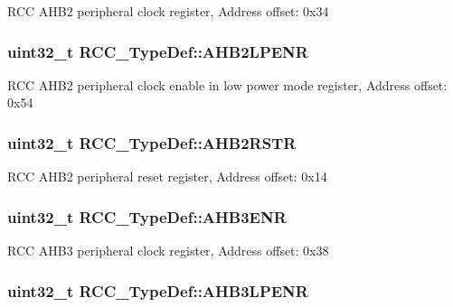 R\-C\-C A\-H\-B2 peripheral clock register, Address offset\-: 0x34 \hypertarget{struct_r_c_c___type_def_a1de344446cba3f4dd15c56fbe20eb0dd}{
\subsubsection[{A\-H\-B2\-L\-P\-E\-N\-R}]{ uint32\-\_\-t R\-C\-C\-\_\-\-Type\-Def\-::\-A\-H\-B2\-L\-P\-E\-N\-R}}\label{struct_r_c_c___type_def_a1de344446cba3f4dd15c56fbe20eb0dd}
R\-C\-C A\-H\-B2 peripheral clock enable in low power mode register, Address offset\-: 0x54 \hypertarget{struct_r_c_c___type_def_a343e0230ded55920ff2a04fbde0e5bcd}{
\subsubsection[{A\-H\-B2\-R\-S\-T\-R}]{ uint32\-\_\-t R\-C\-C\-\_\-\-Type\-Def\-::\-A\-H\-B2\-R\-S\-T\-R}}\label{struct_r_c_c___type_def_a343e0230ded55920ff2a04fbde0e5bcd}
R\-C\-C A\-H\-B2 peripheral reset register, Address offset\-: 0x14 \hypertarget{struct_r_c_c___type_def_ad4ea7be562b42e2ae1a84db44121195d}{
\subsubsection[{A\-H\-B3\-E\-N\-R}]{ uint32\-\_\-t R\-C\-C\-\_\-\-Type\-Def\-::\-A\-H\-B3\-E\-N\-R}}\label{struct_r_c_c___type_def_ad4ea7be562b42e2ae1a84db44121195d}
R\-C\-C A\-H\-B3 peripheral clock register, Address offset\-: 0x38 \hypertarget{struct_r_c_c___type_def_a95edda857c3725bfb410d3a4707edfd8}{
\subsubsection[{A\-H\-B3\-L\-P\-E\-N\-R}]{ uint32\-\_\-t R\-C\-C\-\_\-\-Type\-Def\-::\-A\-H\-B3\-L\-P\-E\-N\-R}}\label{struct_r_c_c___type_def_a95edda857c3725bfb410d3a4707edfd8}
